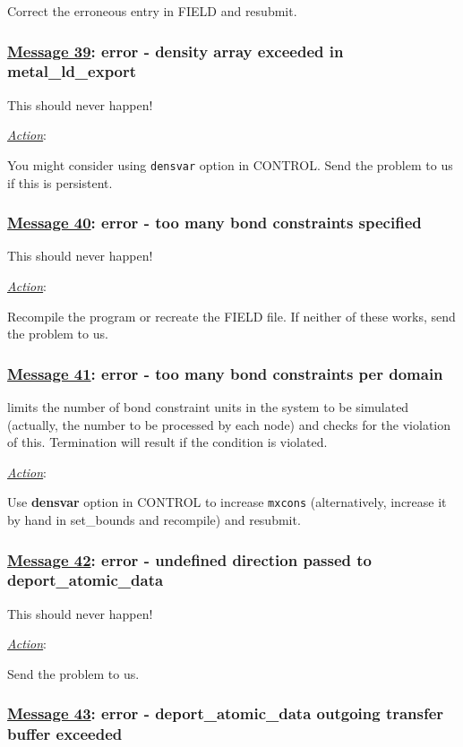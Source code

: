 Correct the erroneous entry in FIELD and resubmit.

\subsubsection*{\underline{Message 39}: error - density array exceeded in metal\_ld\_export}

This should never happen!

\noindent \underline{\em Action}:

You might consider using {\tt densvar} option in CONTROL.  Send
the problem to us if this is persistent.

\subsubsection*{\underline{Message 40}: error - too many bond constraints specified}

This should never happen!

\noindent \underline{\em Action}:

Recompile the program or recreate the FIELD file.  If neither of
these works, send the problem to us.

\subsubsection*{\underline{Message 41}: error - too many bond constraints per domain}

\D limits the number of bond constraint units
in the system to be simulated (actually, the number to be processed
by each node) and checks for the violation of this.  Termination will
result if the condition is violated.

\noindent \underline{\em Action}:

Use {\bf densvar} option in CONTROL to increase {\tt mxcons}
(alternatively, increase it by hand in {\sc set\_bounds} and
recompile) and resubmit.

\subsubsection*{\underline{Message 42}: error - undefined direction passed to deport\_atomic\_data}

This should never happen!

\noindent \underline{\em Action}:

Send the problem to us.

\subsubsection*{\underline{Message 43}: error - deport\_atomic\_data outgoing transfer buffer exceeded}

